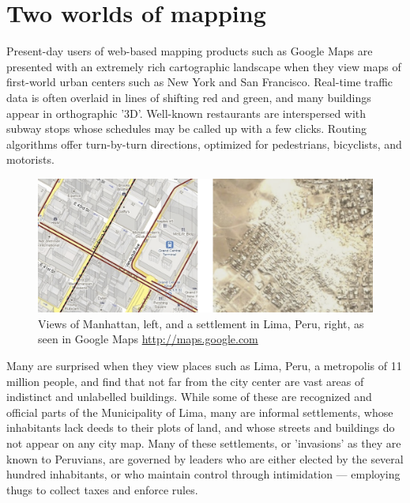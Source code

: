 \documentclass[11pt]{report}
\begin{document}
\section{Two worlds of mapping}
\label{sec:twoworlds}

Present-day users of web-based mapping products such as Google Maps are presented with an extremely rich cartographic landscape when they view maps of first-world urban centers such as New York and San Francisco. Real-time traffic data is often overlaid in lines of shifting red and green, and many buildings appear in orthographic '3D'. Well-known restaurants are interspersed with subway stops whose schedules may be called up with a few clicks. Routing algorithms offer turn-by-turn directions, optimized for pedestrians, bicyclists, and motorists. 

\begin{figure}[h]
	\begin{center}
		\includegraphics[width=1\textwidth]{images/two-worlds-mapping.png}
		Views of Manhattan, left, and a settlement in Lima, Peru, right, as seen in Google Maps \url{http://maps.google.com}
	\end{center}
\end{figure}

Many are surprised when they view places such as Lima, Peru, a metropolis of 11 million people, and find that not far from the city center are vast areas of indistinct and unlabelled buildings. While some of these are recognized and official parts of the Municipality of Lima, many are informal settlements, whose inhabitants lack deeds to their plots of land, and whose streets and buildings do not appear on any city map. Many of these settlements, or 'invasions' as they are known to Peruvians, are governed by leaders who are either elected by the several hundred inhabitants, or who maintain control through intimidation --- employing thugs to collect taxes and enforce rules. 
\end{document}
